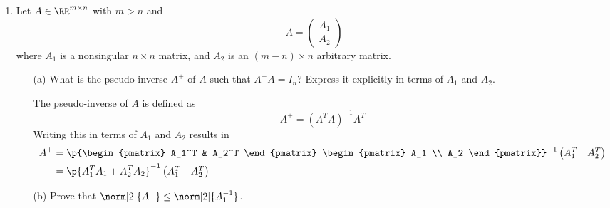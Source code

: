 \documentclass[11pt]{article}
\begin{document}
\begin{enumerate}
    \item %
        Let $A \in \RR^{m \times n}$ with $m > n$ and
        \[
            A = 
            \begin{pmatrix}
                A_1 \\
                A_2
            \end{pmatrix}
        \]
        where $A_1$ is a nonsingular $n \times n$ matrix, and $A_2$ is an
        $(m - n) \times n$ arbitrary matrix.
        \begin{enumerate}
            \item[(a)] %
                What is the pseudo-inverse $A^+$ of $A$ such that $A^+ A = I_n$?
                Express it explicitly in terms of $A_1$ and $A_2$.

                The pseudo-inverse of $A$ is defined as
                \[
                    A^+ = (A^T A)^{-1} A^T
                \]
                Writing this in terms of $A_1$ and $A_2$ results in
                \begin{align*}
                    A^+ &=
                    \p{\begin{pmatrix}
                        A_1^T & A_2^T
                    \end{pmatrix}
                    \begin{pmatrix}
                        A_1 \\
                        A_2
                    \end{pmatrix}}^{-1}
                    \begin{pmatrix}
                        A_1^T & A_2^T
                    \end{pmatrix} \\
                    &= \p{A_1^T A_1 + A_2^T A_2}^{-1}
                    \begin{pmatrix}
                        A_1^T & A_2^T
                    \end{pmatrix}
                \end{align*}

            \item[(b)] %
                Prove that $\norm[2]{A^+} \le \norm[2]{A_1^{-1}}$.


\end{enumerate}
\end{enumerate}
\end{document}
